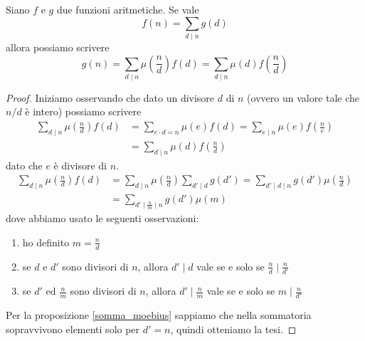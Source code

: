 \begin{teorema}
	Siano $f$ e $g$ due funzioni aritmetiche. Se vale 
	\begin{equation*}
	f(n)=\sum_{d\mid n}g(d)
	\end{equation*}
	allora possiamo scrivere
	\begin{equation*}
	g(n)=\sum_{d\mid n}\mu\left(\frac{n}{d}\right)f(d)=\sum_{d\mid n}\mu(d)f\left(\frac{n}{d}\right)
	\end{equation*}
\end{teorema}
\begin{proof}
	Iniziamo osservando che dato un divisore $d$ di $n$ (ovvero un valore tale che $n/d$ è intero) possiamo scrivere
	\begin{align*}
	\sum_{d\mid n}\mu\left(\frac{n}{d}\right)f(d)&=\sum_{e\cdot d=n}\mu(e)f(d)=\sum_{e\mid n}\mu(e)f\left(\frac{n}{e}\right)\\
	&=\sum_{d\mid n}\mu(d)f\left(\frac{n}{d}\right)
	\end{align*}
	dato che $e$ è divisore di $n$.
	\begin{align*}
	\sum_{d\mid n}\mu\left(\frac{n}{d}\right)f(d)&=\sum_{d\mid n}\mu\left(\frac{n}{d}\right)\sum_{d'\mid d}g(d')=\sum_{d'\mid d\mid n}g(d')\mu\left(\frac{n}{d}\right)\\
	&=\sum_{d'\mid \frac{n}{m}\mid n}g(d')\mu\left(m\right)
	\end{align*}
	dove abbiamo usato le seguenti osservazioni:
	\begin{enumerate}
		\item ho definito $m=\frac{n}{d}$
		\item se $d$ e $d'$ sono divisori di $n$, allora $d'\mid d$ vale se e solo se $\frac{n}{d}\mid \frac{n}{d'}$
		\item se $d'$ ed $\frac{n}{m}$ sono divisori di $n$, allora $d'\mid \frac{n}{m}$ vale se e solo se $m\mid \frac{n}{d'}$
	\end{enumerate}
	Per la proposizione \ref{somma_moebius} sappiamo che nella sommatoria sopravvivono elementi solo per $d'=n$, quindi otteniamo la tesi.
\end{proof}
